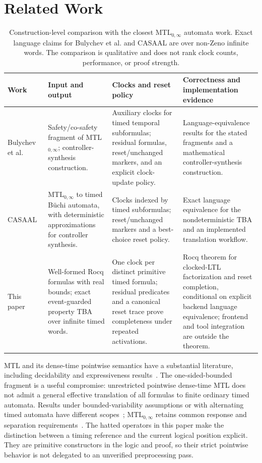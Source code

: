 \documentclass[10pt,journal,compsoc]{IEEEtran}
\begin{document}
\section{Related Work}
\label{sec:related}
\begin{table}[!t]
\centering
\caption{Construction-level comparison with the closest MTL$_{0,\infty}$
automata work. Exact language claims for Bulychev et al. and CASAAL are over
non-Zeno infinite words. The comparison is qualitative and does not rank clock
counts, performance, or proof strength.}
\label{tab:prior-construction-comparison}
\small
\setlength{\tabcolsep}{4pt}
\begin{tabular}{@{}p{}p{}p{}p{}@{}}
\toprule
Work & Input and output & Clocks and reset policy & Correctness and implementation evidence\\
\midrule
Bulychev et al.~\cite{[BDLG14]} & Safety/co-safety fragment of MTL$_{0,\infty}$; controller-synthesis construction. & Auxiliary clocks for timed temporal subformulas; residual formulas, reset/unchanged markers, and an explicit clock-update policy. & Language-equivalence results for the stated fragments and a mathematical controller-synthesis construction.\\
CASAAL~\cite{li_spin7,casaal_tool} & MTL$_{0,\infty}$ to timed B\"uchi automata, with deterministic approximations for controller synthesis. & Clocks indexed by timed subformulas; reset/unchanged markers and a best-choice reset policy. & Exact language equivalence for the nondeterministic TBA and an implemented translation workflow.\\
This paper & Well-formed Rocq formulas with real bounds; exact event-guarded property TBA over infinite timed words. & One clock per distinct primitive timed formula; residual predicates and a canonical reset trace prove completeness under repeated activations. & Rocq theorem for clocked-LTL factorization and reset completion, conditional on explicit backend language equivalence; frontend and tool integration are outside the theorem.\\
\bottomrule
\end{tabular}
\end{table}

MTL and its dense-time pointwise semantics have a substantial literature,
including decidability and expressiveness results~\cite{[RK90],[RTH96],MTLsem,
ouaknine_worrell_lics05,bouyer_chevalier_markey_fsttcs05}. The one-sided-bounded
fragment is a useful compromise: unrestricted pointwise dense-time MTL does
not admit a general effective translation of all formulas to finite ordinary
timed automata. Results under bounded-variability assumptions or with
alternating timed automata have different scopes~\cite{nickovic_piterman_formats10,[BM14]}; MTL$_{0,\infty}$ retains common
response and separation requirements~\cite{[RTH96],[BDLG14]}. The hatted
operators in this paper make the distinction between a timing reference and
the current logical position explicit. They are primitive constructors in
the logic and proof, so their strict pointwise behavior is not delegated to an
unverified preprocessing pass.
\end{document}
